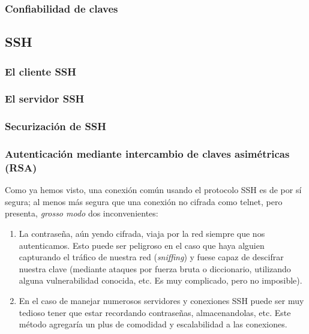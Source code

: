 \documentclass[a4paper, 11pt, titlepage]{book}
\begin{document}
            \subsubsection{Confiabilidad de claves}
    
        \subsection{SSH}
    
            \subsubsection{El cliente SSH}
            \subsubsection{El servidor SSH}
            \subsubsection{Securización de SSH}
            \subsubsection{Autenticación mediante intercambio de claves asimétricas (RSA)}
    
                Como ya hemos visto, una conexión común usando el protocolo SSH es de por sí 
                segura; al menos más segura que una conexión no cifrada como telnet, pero presenta,
                \textit{grosso modo} dos inconvenientes:
    
                \begin{enumerate}
                    \item La contraseña, aún yendo cifrada, viaja por la red siempre que nos autenticamos.
                    Esto puede ser peligroso en el caso que haya alguien capturando el tráfico de nuestra 
                    red (\textit{sniffing}) y fuese capaz de descifrar nuestra clave (mediante ataques por 
                    fuerza bruta o diccionario, utilizando alguna vulnerabilidad conocida, etc. Es muy 
                    complicado, pero no imposible).
                    \item En el caso de manejar numerosos servidores y conexiones SSH puede ser muy tedioso 
                    tener que estar recordando contraseñas, almacenandolas, etc. Este método agregaría un plus 
                    de comodidad y escalabilidad a las conexiones.
                \end{enumerate}
    
\end{document}
